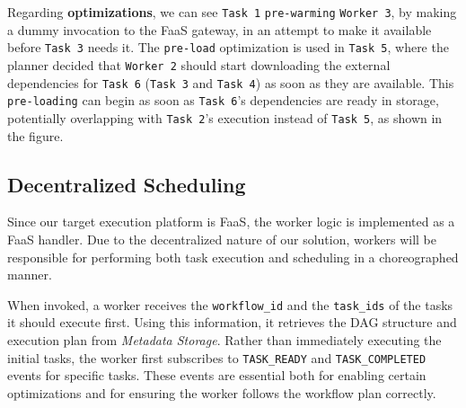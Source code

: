 \documentclass[conference]{IEEEtran}
\begin{document}
Regarding \textbf{optimizations}, we can see \texttt{Task 1} \texttt{pre-warming} \texttt{Worker 3}, by making  a dummy invocation to the FaaS gateway, in an attempt to make it available before \texttt{Task 3} needs it. The \texttt{pre-load} optimization is used in \texttt{Task 5}, where the planner decided that \texttt{Worker 2} should start downloading the external dependencies for \texttt{Task 6} (\texttt{Task 3} and \texttt{Task 4}) as soon as they are available. This \texttt{pre-loading} can begin as soon as \texttt{Task 6}'s dependencies are ready in storage, potentially overlapping with \texttt{Task 2}'s execution instead of \texttt{Task 5}, as shown in the figure.


\subsection{Decentralized Scheduling}

Since our target execution platform is FaaS, the worker logic is implemented as a FaaS handler. Due to the decentralized nature of our solution, workers will be responsible for performing both task execution and scheduling in a choreographed manner. 

When invoked, a worker receives the \texttt{workflow\_id} and the \texttt{task\_ids} of the tasks it should execute first. Using this information, it retrieves the DAG structure and execution plan from \textit{Metadata Storage}. Rather than immediately executing the initial tasks, the worker first subscribes to \texttt{TASK\_READY} and \texttt{TASK\_COMPLETED} events for specific tasks. These events are essential both for enabling certain optimizations and for ensuring the worker follows the workflow plan correctly.
\end{document}
